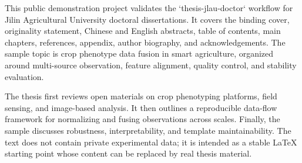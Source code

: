 
This public demonstration project validates the `thesis-jlau-doctor` workflow for Jilin Agricultural University doctoral dissertations. It covers the binding cover, originality statement, Chinese and English abstracts, table of contents, main chapters, references, appendix, author biography, and acknowledgements. The sample topic is crop phenotype data fusion in smart agriculture, organized around multi-source observation, feature alignment, quality control, and stability evaluation.

The thesis first reviews open materials on crop phenotyping platforms, field sensing, and image-based analysis. It then outlines a reproducible data-flow framework for normalizing and fusing observations across scales. Finally, the sample discusses robustness, interpretability, and template maintainability. The text does not contain private experimental data; it is intended as a stable LaTeX starting point whose content can be replaced by real thesis material.

\jlauKeywordsEnLine

